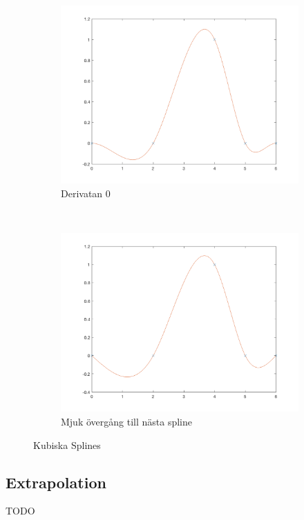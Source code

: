 \documentclass[12pt,a4paper]{article}
\begin{document}
\begin{figure}[H]
    \centering
    \begin{subfigure}[b]{0.45\textwidth}
        \includegraphics[width=\textwidth]{3-2}
        \caption{Derivatan 0}
    \end{subfigure}
    ~ %
    \begin{subfigure}[b]{0.45\textwidth}
        \includegraphics[width=\textwidth]{3-1}
        \caption{Mjuk övergång till nästa spline}
    \end{subfigure}
    \caption{Kubiska Splines}
\end{figure}


\subsection{Extrapolation}
TODO
\end{document}
